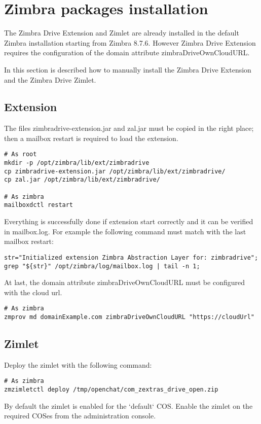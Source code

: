 \section{Zimbra packages installation}

\begin{warning}
The Zimbra Drive Extension and Zimlet are already installed in the default Zimbra installation
starting from Zimbra 8.7.6. However Zimbra Drive Extension requires the configuration of the domain attribute zimbraDriveOwnCloudURL.
\end{warning}
In this section is described how to manually install the Zimbra Drive Extension and the Zimbra Drive Zimlet.
\subsection{Extension}
    The files zimbradrive-extension.jar and zal.jar must be copied in the right place;
    then a mailbox restart is required to load the extension.
    \begin{verbatim}
# As root
mkdir -p /opt/zimbra/lib/ext/zimbradrive
cp zimbradrive-extension.jar /opt/zimbra/lib/ext/zimbradrive/
cp zal.jar /opt/zimbra/lib/ext/zimbradrive/

# As zimbra
mailboxdctl restart
    \end{verbatim}
    Everything is successfully done if extension start correctly and it can be verified in mailbox.log.
    For example the following command must match with the last mailbox restart:
    \begin{verbatim}
str="Initialized extension Zimbra Abstraction Layer for: zimbradrive";
grep "${str}" /opt/zimbra/log/mailbox.log | tail -n 1;
    \end{verbatim}

    At last, the domain attribute zimbraDriveOwnCloudURL must be configured with the cloud url.

    \begin{verbatim}
# As zimbra
zmprov md domainExample.com zimbraDriveOwnCloudURL "https://cloudUrl"
    \end{verbatim}

\subsection{Zimlet}
    Deploy the zimlet with the following command:
    \begin{verbatim}
# As zimbra
zmzimletctl deploy /tmp/openchat/com_zextras_drive_open.zip
    \end{verbatim}
    By default the zimlet is enabled for the `default` COS.
    Enable the zimlet on the required COSes from the administration console.

    